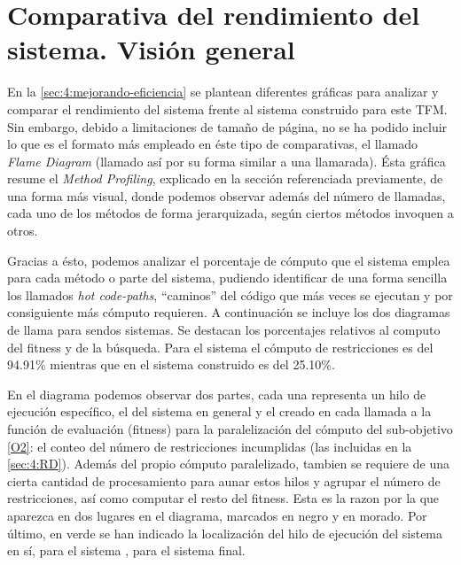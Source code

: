 \graphicspath{{anexos/AnexoC-Flame-Diagram/recursos/}}

\section{Comparativa del rendimiento del sistema. Visión general} \label{Anexo:flame-diagram}

En la \autoref{sec:4:mejorando-eficiencia} se plantean diferentes gráficas para analizar y comparar el rendimiento del sistema \legacy{} frente al sistema construido para este TFM. Sin embargo, debido a limitaciones de tamaño de página, no se ha podido incluir lo que es el formato más empleado en éste tipo de comparativas, el llamado \textit{Flame Diagram} (llamado así por su forma similar a una llamarada). Ésta gráfica resume el \textit{Method Profiling}, explicado en la sección referenciada previamente, de una forma más visual, donde podemos observar además del número de llamadas, cada uno de los métodos de forma jerarquizada, según ciertos métodos invoquen a otros.

Gracias a ésto, podemos analizar el porcentaje de cómputo que el sistema emplea para cada método o parte del sistema, pudiendo identificar de una forma sencilla los llamados \textit{hot code-paths}, ``caminos'' del código que más veces se ejecutan y por consiguiente más cómputo requieren. A continuación se incluye los dos diagramas de llama para sendos sistemas. Se destacan los porcentajes relativos al computo del fitness y de la búsqueda. Para el sistema \legacy{} el cómputo de restricciones es del 94.91\% mientras que en el sistema construido es del 25.10\%.

En el diagrama podemos observar dos partes, cada una representa un hilo de ejecución específico, el del sistema en general y el creado en cada llamada a la función de evaluación (fitness) para la paralelización del cómputo del sub-objetivo \ref{O2}: el conteo del número de restricciones incumplidas (las incluidas en la \autoref{sec:4:RD}). Además del propio cómputo paralelizado, tambien se requiere de una cierta cantidad de procesamiento para aunar estos hilos y agrupar el número de restricciones, así como computar el resto del fitness. Esta es la razon por la que aparezca en dos lugares en el diagrama, marcados en negro y en morado.
Por último, en verde se han indicado la localización del hilo de ejecución del sistema en sí, \sa{} para el sistema \legacy{}, \vns{} para el sistema final.

